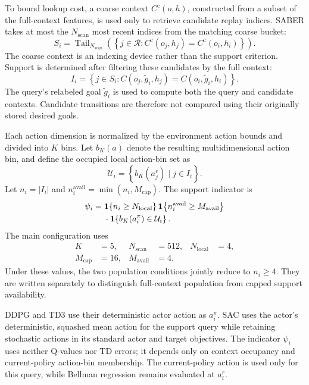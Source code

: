 \documentclass[letterpaper]{article}
\begin{document}
To bound lookup cost, a coarse context \(C^{\mathrm c}(o,h)\), constructed from a subset of the full-context features, is used only to retrieve candidate replay indices. SABER takes at most the \(N_{\mathrm{scan}}\) most recent indices from the matching coarse bucket:
\begin{equation}
S_i=
\operatorname{Tail}_{N_{\mathrm{scan}}}
\left(
\left\{
j\in\mathcal{R}:
C^{\mathrm c}(o_j,h_j)=C^{\mathrm c}(o_i,h_i)
\right\}
\right).
\end{equation}
The coarse context is an indexing device rather than the support criterion. Support is determined after filtering these candidates by the full context:
\begin{equation}
I_i=
\left\{
j\in S_i:
C(o_j,\tilde g_i,h_j)=C(o_i,\tilde g_i,h_i)
\right\}.
\end{equation}
The query's relabeled goal \(\tilde g_i\) is used to compute both the query and candidate contexts. Candidate transitions are therefore not compared using their originally stored desired goals.

Each action dimension is normalized by the environment action bounds and divided into \(K\) bins. Let \(b_K(a)\) denote the resulting multidimensional action bin, and define the occupied local action-bin set as
\begin{equation}
\mathcal{U}_i=
\left\{
b_K(a_j^r)\mid j\in I_i
\right\}.
\end{equation}
Let \(n_i=|I_i|\) and \(n_i^{\mathrm{avail}}=\min(n_i,M_{\mathrm{cap}})\). The support indicator is
\begin{align}
\psi_i={}&
\mathbf{1}\!\left\{n_i\geq N_{\mathrm{local}}\right\}
\mathbf{1}\!\left\{n_i^{\mathrm{avail}}\geq M_{\mathrm{avail}}\right\}\notag\\
&\cdot
\mathbf{1}\!\left\{b_K(a_i^\pi)\in\mathcal{U}_i\right\}.
\end{align}
The main configuration uses
\begin{equation}
\begin{aligned}
K&=5, & N_{\mathrm{scan}}&=512, & N_{\mathrm{local}}&=4,\\
M_{\mathrm{cap}}&=16, & M_{\mathrm{avail}}&=4. &&
\end{aligned}
\end{equation}
Under these values, the two population conditions jointly reduce to \(n_i\geq4\). They are written separately to distinguish full-context population from capped support availability.

DDPG and TD3 use their deterministic actor action as \(a_i^\pi\). SAC uses the actor's deterministic, squashed mean action for the support query while retaining stochastic actions in its standard actor and target objectives. The indicator \(\psi_i\) uses neither Q-values nor TD errors; it depends only on context occupancy and current-policy action-bin membership. The current-policy action is used only for this query, while Bellman regression remains evaluated at \(a_i^r\).
\end{document}

